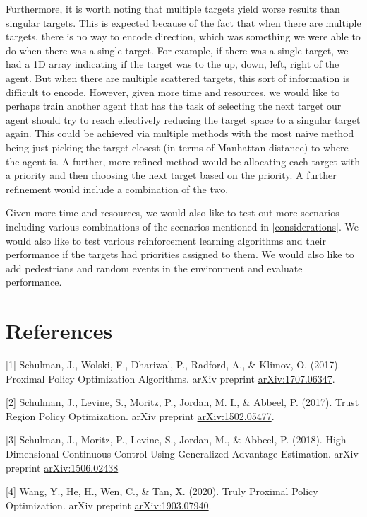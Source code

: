 \documentclass{article}
\begin{document}
Furthermore, it is worth noting that multiple targets yield worse results than singular targets. This is expected because of the fact that when there are multiple targets, there is no way to encode direction, which was something we were able to do when there was a single target. For example, if there was a single target, we had a 1D array indicating if the target was to the up, down, left, right of the agent. But when there are multiple scattered targets, this sort of information is difficult to encode. However, given more time and resources, we would like to perhaps train another agent that has the task of selecting the next target our agent should try to reach effectively reducing the target space to a singular target again. This could be achieved via multiple methods with the most na\"ive method being just picking the target closest (in terms of Manhattan distance) to where the agent is. A further, more refined method would be allocating each target with a priority and then choosing the next target based on the priority. A further refinement would include a combination of the two.

Given more time and resources, we would also like to test out more scenarios including various combinations of the scenarios mentioned in \ref{considerations}. We would also like to test various reinforcement learning algorithms and their performance if the targets had priorities assigned to them. We would also like to add pedestrians and random events in the environment and evaluate performance.

\section*{References}


[1] Schulman, J., Wolski, F., Dhariwal, P., Radford, A., \& Klimov, O. (2017). Proximal Policy Optimization Algorithms. arXiv preprint \href{https://arxiv.org/abs/1707.06347}{arXiv:1707.06347}.

[2] Schulman, J., Levine, S., Moritz, P., Jordan, M. I., \& Abbeel, P. (2017). Trust Region Policy Optimization. arXiv preprint \href{https://arxiv.org/abs/1502.05477}{arXiv:1502.05477}.

[3] Schulman, J., Moritz, P., Levine, S., Jordan, M., \& Abbeel, P. (2018). High-Dimensional Continuous Control Using Generalized Advantage Estimation. arXiv preprint \href{https://arxiv.org/abs/1506.02438}{arXiv:1506.02438}

[4] Wang, Y., He, H., Wen, C., \& Tan, X. (2020). Truly Proximal Policy Optimization. arXiv preprint \href{https://arxiv.org/abs/1903.07940}{arXiv:1903.07940}.
\end{document}
